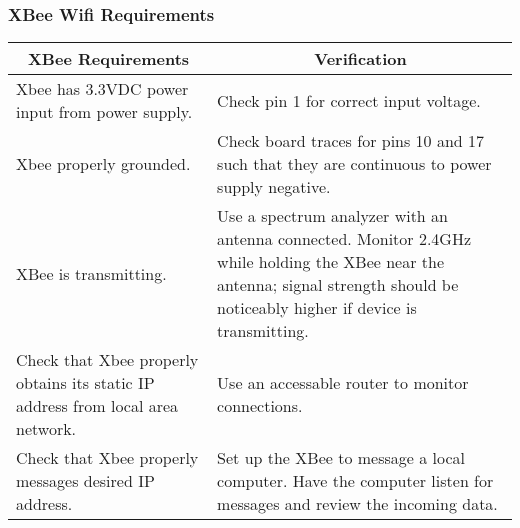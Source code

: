 \subsubsection{XBee Wifi Requirements}
\begin{tabular}{|p{\mytabwidth}|p{\mytabwidth}|}
\hline
\multicolumn{1}{|c|}{XBee Requirements} & \multicolumn{1}{|c|}{Verification} \\
\hline\hline
Xbee has 3.3VDC power input from power supply. & Check pin 1 for correct input voltage.\\
\hline
Xbee properly grounded. & Check board traces for pins 10 and 17 such that they are continuous to power supply negative. \\
\hline
XBee is transmitting. & Use a spectrum analyzer with an antenna connected. Monitor 2.4GHz while holding the XBee near the antenna; signal strength should be noticeably higher if device is transmitting.\\
\hline
Check that Xbee properly obtains its static IP address from local area network. & Use an accessable router to monitor connections.\\
\hline
Check that Xbee properly messages desired IP address. & Set up the XBee to message a local computer.  Have the computer listen for messages and review the incoming data.\\
\hline
\end{tabular}
